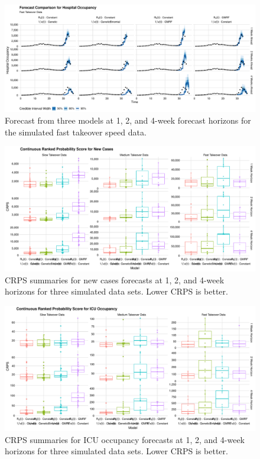 \begin{figure}
    \centering
    \includegraphics[width=1.0\columnwidth]{simulated_forecast_comparison_data_hospitalizations_fast_plot}
    \caption{Forecast from three models at 1, 2, and 4-week forecast horizons for the simulated fast takeover speed data.}
    \label{ch_5:fig:simulated_forecast_comparison_data_hospitalizations_fast_plot}
\end{figure}

\begin{figure}
    \centering
    \includegraphics[width=1.0\columnwidth]{simulated_crps_comparison_boxplot_data_new_cases_plot}
    \caption{CRPS summaries for new cases forecasts at 1, 2, and 4-week horizons for three simulated data sets. Lower CRPS is better.}
    \label{ch_5:fig:simulated_crps_comparison_boxplot_data_new_cases_plot}
\end{figure}

\begin{figure}
    \centering
    \includegraphics[width=1.0\columnwidth]{simulated_crps_comparison_boxplot_data_icu_plot}
    \caption{CRPS summaries for ICU occupancy forecasts at 1, 2, and 4-week horizons for three simulated data sets. Lower CRPS is better.}
    \label{ch_5:fig:simulated_crps_comparison_boxplot_data_icu_plot}
\end{figure}

